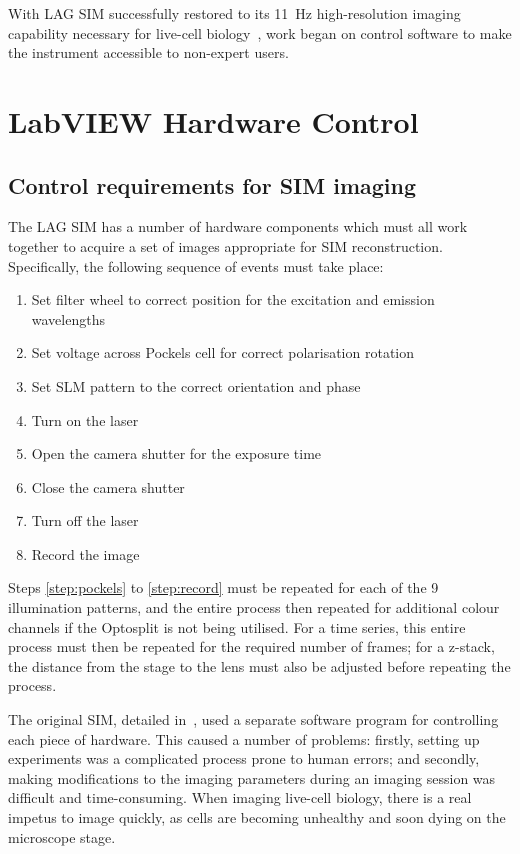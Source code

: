 With LAG SIM successfully restored to its \SI{11}{\hertz} high-resolution imaging capability necessary for live-cell biology~\cite{strohl2017speed}, work began on control software to make the instrument accessible to non-expert users. 


\section{LabVIEW Hardware Control} \label{sec:labview}
\subsection{Control requirements for SIM imaging} \label{sec:SIMsteps}
The LAG SIM has a number of hardware components which must all work together to acquire a set of images appropriate for SIM reconstruction.
Specifically, the following sequence of events must take place:
\begin{enumerate}
	\item Set filter wheel to correct position for the excitation and emission wavelengths
	\item\label{step:pockels} Set voltage across Pockels cell for correct polarisation rotation
	\item Set SLM pattern to the correct orientation and phase
	\item Turn on the laser
	\item Open the camera shutter for the exposure time
	\item Close the camera shutter
	\item Turn off the laser
	\item\label{step:record} Record the image
\end{enumerate}
Steps \ref{step:pockels} to \ref{step:record} must be repeated for each of the 9 illumination patterns, and the entire process then repeated for additional colour channels if the Optosplit is not being utilised. 
For a time series, this entire process must then be repeated for the required number of frames; for a z-stack, the distance from the stage to the lens must also be adjusted before repeating the process. 

The original SIM, detailed in~\cite{young2016guide}, used a separate software program for controlling each piece of hardware. 
This caused a number of problems: firstly, setting up experiments was a complicated process prone to human errors; and secondly, making modifications to the imaging parameters during an imaging session was difficult and time-consuming. 
When imaging live-cell biology, there is a real impetus to image quickly, as cells are becoming unhealthy and soon dying on the microscope stage. 

